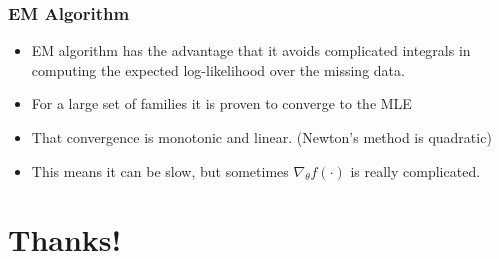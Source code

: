 \begin{frame}
\frametitle{EM Algorithm}
\begin{itemize}
\item EM algorithm has the advantage that it avoids complicated integrals in computing the expected log-likelihood over the missing data.
\item For a large set of families it is proven to converge to the MLE
\item That convergence is \alert{monotonic} and \alert{linear}. (Newton's method is quadratic)
\item This means it can be slow, but sometimes $\nabla_{\theta} f (\cdot)$ is really complicated.
\end{itemize}
\end{frame}

\section*{Thanks!}

